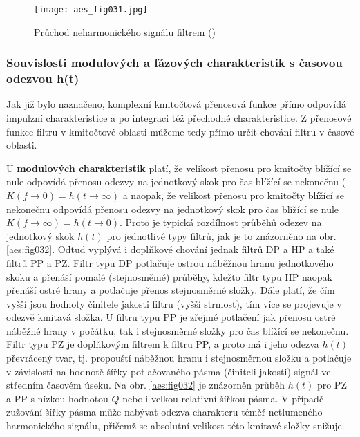       \begin{figure}[ht!]
        \centering
        \texttt{[image: aes\_fig031.jpg]}
        \caption{Průchod neharmonického signálu filtrem (\cite[s.~31]{HajekSedlacek2002})}
        \label{aes:fig031}    
      \end{figure}

      \subsubsection{Souvislosti modulových a fázových charakteristik s časovou odezvou h(t)}
        Jak již bylo naznačeno, komplexní kmitočtová přenosová funkce přímo odpovídá impulzní
        charakteristice a po integraci též přechodné charakteristice. Z přenosové funkce filtru v
        kmitočtové oblasti můžeme tedy přímo určit chování filtru v časové oblasti. 
        
        U \textbf{modulových charakteristik} platí, že velikost přenosu pro kmitočty blížící se nule
        odpovídá přenosu odezvy na jednotkový skok pro čas blížící se nekonečnu (\(K(f\rightarrow0)
        = h(t\rightarrow \infty)\) a naopak, že velikost přenosu pro kmitočty blížící se nekonečnu
        odpovídá přenosu odezvy na jednotkový skok pro čas blížící se nule \(K(f\rightarrow\infty) =
        h(t\rightarrow0)\). Proto je typická rozdílnost  průběhů odezev na jednotkový skok \(h(t)\)
        pro jednotlivé typy filtrů, jak je to znázorněno na obr. \ref{aes:fig032}. Odtud vyplývá i
        doplňkové chování jednak filtrů DP a HP a také filtrů PP a PZ. Filtr typu DP potlačuje
        ostrou náběžnou hranu jednotkového skoku a přenáší pomalé (stejnosměmé) průběhy, kdežto
        filtr typu HP naopak přenáší ostré hrany a potlačuje přenos stejnosměrné složky. Dále platí,
        že čím vyšší jsou hodnoty činitele jakosti filtru (vyšší strmost), tím více se projevuje v
        odezvě kmitavá složka. U filtru typu PP je zřejmé potlačení jak přenosu ostré náběžné hrany
        v počátku, tak i stejnosměrné složky pro čas blížící se nekonečnu. Filtr typu PZ je
        doplňkovým filtrem k filtru PP, a proto má i jeho odezva \(h(t)\) převrácený tvar, tj.
        propouští náběžnou hranu i stejnosměrnou složku a potlačuje v závislosti na hodnotě šířky
        potlačovaného pásma (činiteli jakosti) signál ve středním časovém úseku. Na obr.
        \ref{aes:fig032} je znázorněn průběh \(h(t)\) pro PZ a PP s nízkou hodnotou \(Q\) neboli
        velkou relativní šířkou pásma. V případě zužování šířky pásma může nabývat odezva charakteru
        téměř netlumeného harmonického signálu, přičemž se absolutní velikost této kmitavé složky
        snižuje.

